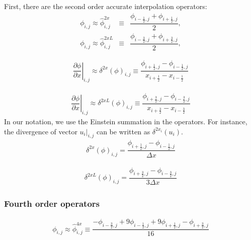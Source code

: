 \documentclass[gmd]{copernicus}
\begin{document}
First, there are the second order accurate interpolation operators:
\begin{eqnarray}
\phi_{i,j} \approx \widehat{\phi}^{2x }_{i,j} & \equiv & \dfrac{\phi_{i-\frac{1}{2},j} + \phi_{i+\frac{1}{2},j}}{2},\\
\phi_{i,j} \approx \widehat{\phi}^{2xL}_{i,j} & \equiv & \dfrac{\phi_{i-\frac{3}{2},j} + \phi_{i+\frac{3}{2},j}}{2},
\end{eqnarray}

\begin{eqnarray}
\left. \dfrac{\partial \phi}{\partial x}\right|_{i,j} \approx \delta^{2x} \left( \phi \right)_{i,j} \equiv \dfrac{\phi_{i+\frac{1}{2},j} - \phi_{i-\frac{1}{2},j}}
                                                                                                                 {   x_{i+\frac{1}{2}}   -    x_{i-\frac{1}{2}  }}
\end{eqnarray}

\begin{eqnarray}
\left. \dfrac{\partial \phi}{\partial x}\right|_{i,j} \approx \delta^{2xL} \left( \phi \right)_{i,j} \equiv \dfrac{\phi_{i+\frac{3}{2},j} - \phi_{i-\frac{3}{2},j}}
                                                                                                                  {   x_{i+\frac{3}{2}}   -    x_{i-\frac{3}{2}  }}
\end{eqnarray}
In our notation, we use the Einstein summation in the operators. For instance, the divergence of vector $\left.u_i\right|_{i,j}$ can be written as $\delta^{2x_i}\left( u_i \right)$.
\begin{eqnarray}
\delta^{2x} \left( \phi \right)_{i,j} = \dfrac{\phi_{i+\frac{1}{2},j} - \phi_{i-\frac{1}{2},j}}
                                              {\Delta x}
\end{eqnarray}

\begin{eqnarray}
\delta^{2xL} \left( \phi \right)_{i,j} = \dfrac{\phi_{i+\frac{3}{2},j} - \phi_{i-\frac{3}{2},j}}
                                               {3\Delta x}
\end{eqnarray}

\subsubsection{Fourth order operators}

\begin{eqnarray}
\phi_{i,j} \approx \widehat{\phi}^{4x}_{i,j} \equiv \dfrac{- \phi_{i-\frac{3}{2},j} + 9 \phi_{i-\frac{1}{2},j} + 9 \phi_{i+\frac{1}{2},j} - \phi_{i+\frac{3}{2},j}}{16}\label{eq:interp4}
\end{eqnarray}
\end{document}
